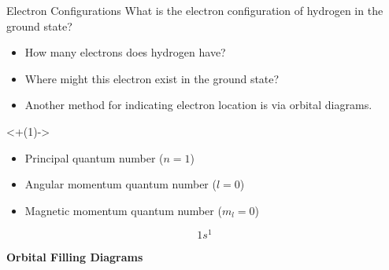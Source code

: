 \documentclass[notes=only]{beamer}
\begin{document}
\begin{frame}[t]{Electron Configurations}
	What is the electron configuration of hydrogen in the ground
	state?
	\begin{itemize}[<+(1)->]
			\item How many electrons does hydrogen have?
			\item Where might this electron exist in the ground
				state?

				\vfill


			\item Another method for indicating electron
				location is via \alert{orbital diagrams}.

				\vfill
	\end{itemize}

\note<+(1)->{%
		\begin{itemize}
				\item Principal quantum number ($n = 1$)
				\item Angular momentum quantum number
					($l = 0$)
				\item Magnetic momentum quantum number
					($m_l = 0$)
			\end{itemize}
		\begin{equation*}
			1s^1
		\end{equation*}

		\textbf{Orbital Filling Diagrams}
		\begin{center}
			\end{center}
}
\end{frame}
\end{document}
